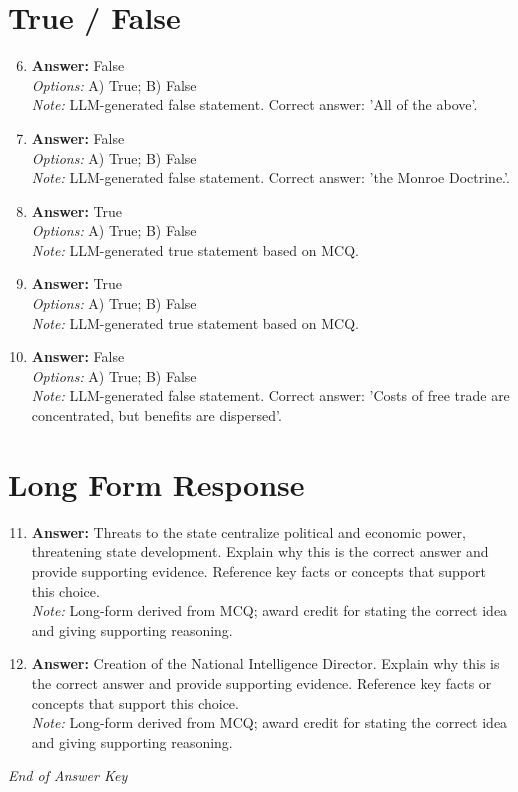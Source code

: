 \documentclass[12pt]{article}
\begin{document}
\section*{True / False}
\begin{enumerate}[label=\arabic*.]
\setcounter{enumi}{5}
\item \textbf{Answer:} False
\\ \textit{Options:} A) True; B) False
\\ \textit{Note:} LLM-generated false statement. Correct answer: 'All of the above'.
\item \textbf{Answer:} False
\\ \textit{Options:} A) True; B) False
\\ \textit{Note:} LLM-generated false statement. Correct answer: 'the Monroe Doctrine.'.
\item \textbf{Answer:} True
\\ \textit{Options:} A) True; B) False
\\ \textit{Note:} LLM-generated true statement based on MCQ.
\item \textbf{Answer:} True
\\ \textit{Options:} A) True; B) False
\\ \textit{Note:} LLM-generated true statement based on MCQ.
\item \textbf{Answer:} False
\\ \textit{Options:} A) True; B) False
\\ \textit{Note:} LLM-generated false statement. Correct answer: 'Costs of free trade are concentrated, but benefits are dispersed'.
\end{enumerate}

\section*{Long Form Response}
\begin{enumerate}[label=\arabic*.]
\setcounter{enumi}{10}
\item \textbf{Answer:} Threats to the state centralize political and economic power, threatening state development. Explain why this is the correct answer and provide supporting evidence. Reference key facts or concepts that support this choice.
\\ \textit{Note:} Long-form derived from MCQ; award credit for stating the correct idea and giving supporting reasoning.
\item \textbf{Answer:} Creation of the National Intelligence Director. Explain why this is the correct answer and provide supporting evidence. Reference key facts or concepts that support this choice.
\\ \textit{Note:} Long-form derived from MCQ; award credit for stating the correct idea and giving supporting reasoning.
\end{enumerate}

\vfill
\noindent\textit{End of Answer Key}
\end{document}
